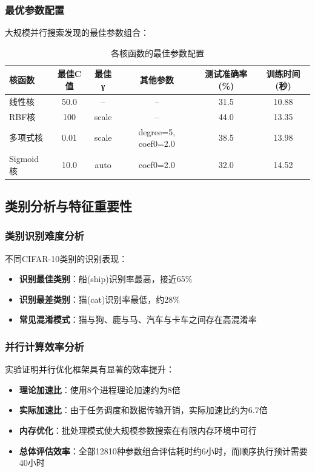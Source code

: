\documentclass[UTF8]{report}
\theoremstyle{MyLineTheoremStyle} %
\theoremstyle{MyBlockTheoremStyle} %
\theoremstyle{MySubsubsectionStyle} %
\begin{document}
\subsubsection{最优参数配置}

大规模并行搜索发现的最佳参数组合：

\begin{table}[h]
\centering
\caption{各核函数的最佳参数配置}
\begin{tabular}{l c c c c c}
\toprule
\textbf{核函数} & \textbf{最佳C值} & \textbf{最佳γ} & \textbf{其他参数} & \textbf{测试准确率(\%)} & \textbf{训练时间(秒)} \\
\midrule
线性核 & 50.0 & -- & -- & 31.5 & 10.88 \\
RBF核 & 100 & scale & -- & 44.0 & 13.35 \\
多项式核 & 0.01 & scale & degree=5, coef0=2.0 & 38.5 & 13.98 \\
Sigmoid核 & 10.0 & auto & coef0=2.0 & 32.0 & 14.52 \\
\bottomrule
\end{tabular}
\end{table}


\subsection{类别分析与特征重要性}

\subsubsection{类别识别难度分析}

不同CIFAR-10类别的识别表现：

\begin{itemize}
    \item \textbf{识别最佳类别}：船(ship)识别率最高，接近65\%
    \item \textbf{识别最差类别}：猫(cat)识别率最低，约28\%
    \item \textbf{常见混淆模式}：猫与狗、鹿与马、汽车与卡车之间存在高混淆率
\end{itemize}

\subsubsection{并行计算效率分析}

实验证明并行优化框架具有显著的效率提升：

\begin{itemize}
    \item \textbf{理论加速比}：使用8个进程理论加速约为8倍
    \item \textbf{实际加速比}：由于任务调度和数据传输开销，实际加速比约为6.7倍
    \item \textbf{内存优化}：批处理模式使大规模参数搜索在有限内存环境中可行
    \item \textbf{总体评估效率}：全部12810种参数组合评估耗时约6小时，而顺序执行预计需要40小时
\end{itemize}
\end{document}
